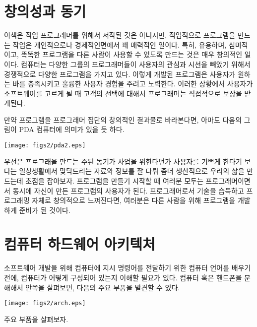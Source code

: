 \section{창의성과 동기}
이책은 직업 프로그래머를 위해서 저작된 것은 아니지만, 직업적으로 프로그램을 만드는 작업은 개인적으로나 경제적인면에서 꽤 매력적인 일이다. 특히, 유용하며, 심미적이고, 똑똑한 프로그램을 다른 사람이 사용할 수 있도록 만드는 것은 매우 창의적인 일이다. 컴퓨터는 다양한 그룹의 프로그래머들이 사용자의 관심과 시선을 빼았기 위해서 경쟁적으로 다양한 프로그램을 가지고 있다. 이렇게 개발된 프로그램은 사용자가 원하는 바를 충족시키고 훌륭한 사용자 경험을 주려고 노력한다. 이러한 상황에서 사용자가 소프트웨어를 고르게 될 때 고객의 선택에 대해서 프로그래머는 직접적으로 보상을 받게된다.

만약 프로그램을 프로그래머 집단의 창의적인 결과물로 바라본다면, 아마도 다음의 그림이 PDA 컴퓨터에 의미가 있을 듯 하다.

\beforefig
\centerline{\texttt{[image: figs2/pda2.eps]}}
\afterfig

우선은 프로그래을 만드는 주된 동기가 사업을 위한다던가 사용자를 기쁘게 한다기 보다는 일상생활에서 맞닥드리는 자료와 정보를 잘 다뤄 좀더 생산적으로 우리의 삶을 만드는데 초점을 잡아보자. 프로그램을 만들기 시작할 때 여러분 모두는 프로그래머이면서 동시에 자신이 만든 프로그램의 사용자가 된다. 프로그래머로서 기술을 습득하고 프로그래밍 자체로 창의적으로 느껴진다면, 여러분은 다른 사람을 위해 프로그램을 개발하게 준비가 된 것이다.

\section{컴퓨터 하드웨어 아키텍처}

소프트웨어 개발을 위해 컴퓨터에 지시 명령어를 전달하기 위한 컴퓨터 언어를 배우기 전에, 컴퓨터가 어떻게 구성되어 있는지 이해할 필요가 있다. 컴퓨터 혹은 핸드폰을 분해해서 안쪽을 살펴보면, 다음의 주요 부품을 발견할 수 있다.

\beforefig
\centerline{\texttt{[image: figs2/arch.eps]}}
\afterfig

주요 부품을 살펴보자.

